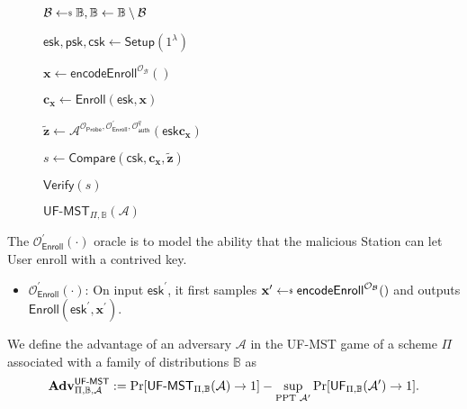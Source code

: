 \begin{figure}[h]
\centering

	\begin{minipage}[t]{0.5\linewidth}
	\begin{algorithm}[H]
	\caption{${\textsf{UF-MST}}_{\Pi, \mathbb{B}}(\mathcal{A})$}
	\label{alg:uf-mst_game}
	\begin{algorithmic}[1]
		\State $\mathcal{B} \getsdollar \mathbb{B}, \mathbb{B} \gets \mathbb{B} \setminus \mathcal{B}$

		\State $\textsf{esk}, \textsf{psk}, \textsf{csk} \gets \textsf{Setup}(1^\lambda)$

		\State $\mathbf{x} \gets \textsf{encodeEnroll}^{\mathcal{O}_{\mathcal{B}}}()$

		\State $\mathbf{c_x} \gets \textsf{Enroll}(\textsf{esk}, \mathbf{x})$

		\State ${\mathbf{\tilde{z}}} \gets \mathcal{A}^{ \mathcal{O}_\textsf{Probe}, \mathcal{O}_\textsf{Enroll}^\prime, \mathcal{O}_\textsf{auth}^q } ( \textsf{esk} \mathbf{c_x} )$

		\State $s \gets \textsf{Compare}( \textsf{csk}, \mathbf{c_x}, \mathbf{\tilde{z}} )$

		\State \Return $\textsf{Verify}(s)$
	\end{algorithmic}
	\end{algorithm}
	\end{minipage}

\label{fig:uf-mst_game}
\end{figure}

The $\mathcal{O}_\textsf{Enroll}^\prime (\cdot)$ oracle is to model the ability that the malicious \textsf{Station} can let \textsf{User} enroll with a contrived key.

\begin{itemize}

	\item $\mathcal{O}_\textsf{Enroll}^\prime (\cdot)$: On input $\textsf{esk}^\prime$, it first samples $\mathbf{x}^\prime \getsdollar \textsf{encodeEnroll}^{\mathcal{O}_{\mathcal{B}}}()$ and outputs $\textsf{Enroll}(\textsf{esk}^\prime, \mathbf{x}^\prime)$.

\end{itemize}

We define the advantage of an adversary $\mathcal{A}$ in the \textsf{UF-MST} game of a scheme $\Pi$ associated with a family of distributions $\mathbb{B}$ as
\[
	\mathbf{Adv}^{\textsf{UF-MST}}_{\Pi, \mathbb{B}, \mathcal{A}} := \Pr[{\textsf{UF-MST}}_{\Pi, \mathbb{B}}(\mathcal{A}) \to 1] -
	\sup_{\text{PPT } \mathcal{A}^\prime} \Pr[\textsf{UF}_{\Pi, \mathbb{B}}(\mathcal{A}^\prime) \to 1].
\]

